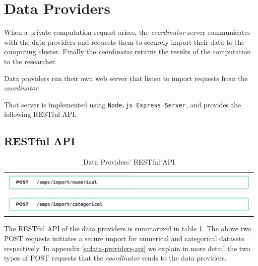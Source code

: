 
\section{Data Providers}\label{s:impl-data-providers}
When a private computation request arises, the \textit{coordinator} server communicates with the data providers and requests them to securely import their data to the computing cluster.
Finally the \textit{coordinator} returns the results of the computation to the researcher.

Data providers run their own web server that listen to import requests from the \textit{coordinator}.

That server is implemented using \texttt{Node.js Express Server}, and provides the following RESTful API.


\subsection{RESTful API}\label{ss:data-providers-restful-api}


\begin{table}[H]
  \centering
  \caption{Data Providers' RESTful API}
  \label{t:data-providers-api}
\begin{tabular}{l}
  \hyperref[s:post4]{\includegraphics[page=1,width=\textwidth]{figures/post4.pdf}} \\
  \hyperref[s:post5]{\includegraphics[page=1,width=\textwidth]{figures/post5.pdf}} \\
\end{tabular}
\end{table}


The RESTful API of the data providers is summarized in table \ref{t:data-providers-api}.
The above two POST requests initiates a secure import for numerical and categorical datasets respectively.
In appendix \ref{s:data-providers-api} we explain in more detail the two types of POST requests that the \textit{coordinator} sends to the data providers.


